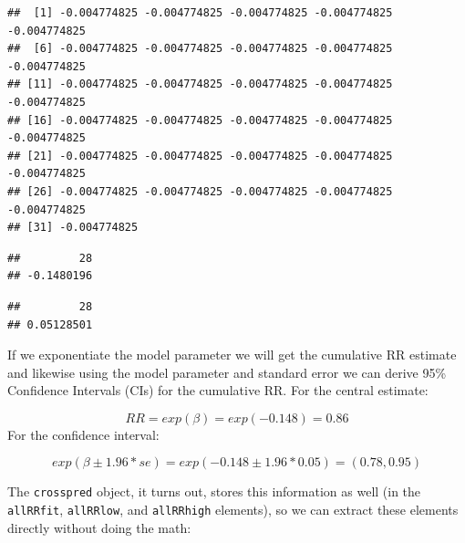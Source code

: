 \documentclass[
]{book}
\newenvironment{Shaded}{\begin{snugshade}}{\end{snugshade}}
\newcommand{\DecValTok}[1]{\textcolor[rgb]{0.00,0.00,0.81}{#1}}
\newcommand{\DocumentationTok}[1]{\textcolor[rgb]{0.56,0.35,0.01}{\textbf{\textit{#1}}}}
\newcommand{\NormalTok}[1]{#1}
\newcommand{\SpecialCharTok}[1]{\textcolor[rgb]{0.00,0.00,0.00}{#1}}
\begin{document}
\begin{verbatim}
##  [1] -0.004774825 -0.004774825 -0.004774825 -0.004774825 -0.004774825
##  [6] -0.004774825 -0.004774825 -0.004774825 -0.004774825 -0.004774825
## [11] -0.004774825 -0.004774825 -0.004774825 -0.004774825 -0.004774825
## [16] -0.004774825 -0.004774825 -0.004774825 -0.004774825 -0.004774825
## [21] -0.004774825 -0.004774825 -0.004774825 -0.004774825 -0.004774825
## [26] -0.004774825 -0.004774825 -0.004774825 -0.004774825 -0.004774825
## [31] -0.004774825
\end{verbatim}

\begin{Shaded}
\end{Shaded}

\begin{verbatim}
##         28 
## -0.1480196
\end{verbatim}

\begin{Shaded}
\end{Shaded}

\begin{verbatim}
##         28 
## 0.05128501
\end{verbatim}

If we exponentiate the model parameter we will get the cumulative RR estimate and likewise using the model parameter and standard error we can derive 95\% Confidence Intervals (CIs) for the cumulative RR. For the central estimate:

\[
RR=exp(\beta)=exp(-0.148)=0.86
\]
For the confidence interval:

\[
exp(\beta \pm 1.96*se) = exp(-0.148 \pm 1.96*0.05) = (0.78, 0.95)
\]

The \texttt{crosspred} object, it turns out, stores this information as well (in the \texttt{allRRfit}, \texttt{allRRlow}, and \texttt{allRRhigh} elements), so we can extract these elements directly without doing the math:
\end{document}
